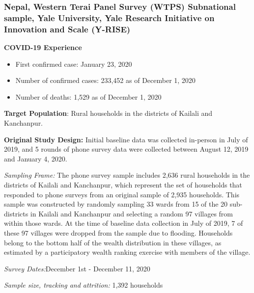 \documentclass[
  12pt,
]{article}
\begin{document}
\hypertarget{nepal-western-terai-panel-survey-wtps-subnational-sample-yale-university-yale-research-initiative-on-innovation-and-scale-y-rise}{%
\subsubsection*{Nepal, Western Terai Panel Survey (WTPS) Subnational sample, Yale University, Yale Research Initiative on Innovation and Scale (Y-RISE)}\label{nepal-western-terai-panel-survey-wtps-subnational-sample-yale-university-yale-research-initiative-on-innovation-and-scale-y-rise}}

\textbf{COVID-19 Experience}

\begin{itemize}
\item First confirmed case: January 23, 2020


\item Number of confirmed cases:  233,452 as of December 1, 2020 
\item Number of deaths:   1,529 as of December 1, 2020
\end{itemize}

\textbf{Target Population}: Rural households in the districts of Kailali and Kanchanpur.

\textbf{Original Study Design:} Initial baseline data was collected in-person in July of 2019, and 5 rounds of phone survey data were collected between August 12, 2019 and January 4, 2020.

\emph{Sampling Frame:} The phone survey sample includes 2,636 rural households in the districts of Kailali and Kanchanpur, which represent the set of households that responded to phone surveys from an original sample of 2,935 households. This sample was constructed by randomly sampling 33 wards from 15 of the 20 sub-districts in Kailali and Kanchanpur and selecting a random 97 villages from within those wards. At the time of baseline data collection in July of 2019, 7 of these 97 villages were dropped from the sample due to flooding. Households belong to the bottom half of the wealth distribution in these villages, as estimated by a participatory wealth ranking exercise with members of the village.

\emph{Survey Dates:}December 1st - December 11, 2020

\emph{Sample size, tracking and attrition:} 1,392 households
\end{document}
